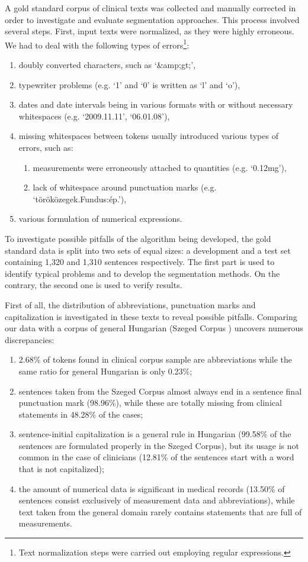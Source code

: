 A gold standard corpus of clinical texts was collected and manually corrected in order to investigate and evaluate segmentation approaches.
This process involved several steps. 
First, input texts were normalized, as they were highly erroneous.
We had to deal with the following types of errors\footnote{Text normalization steps were carried out employing regular expressions.}:
\begin{enumerate}
 \item doubly converted characters, such as `\&amp;gt;',
 \item typewriter problems (e.g. `1' and `0' is written as `l' and `o'),
 \item dates and date intervals being in various formats with or without necessary whitespaces (e.g. `2009.11.11', `06.01.08'),
 \item missing whitespaces between tokens usually introduced various types of errors, such as:
 \begin{enumerate}
  \item measurements were erroneously attached to quantities (e.g. `0.12mg'),
  \item lack of whitespace around punctuation marks (e.g. `töröközegek.Fundus:ép.'),
 \end{enumerate}
 \item various formulation of numerical expressions.
\end{enumerate}
 
To investigate possible pitfalls of the algorithm being developed, the gold standard data is split into two sets of equal sizes: a development and a test set containing 1,320 and 1,310 sentences respectively. 
The first part is used to identify typical problems and to develop the segmentation methods. 
On the contrary, the second one is used to verify results. 

First of all, the distribution of abbreviations, punctuation marks and capitalization is investigated in these texts to reveal possible pitfalls. 
Comparing our data with a corpus of general Hungarian (Szeged Corpus \cite{Csendes2004}) uncovers numerous discrepancies: 
\begin{enumerate}
 \item 2.68\% of tokens found in clinical corpus sample are abbreviations while the same ratio for general Hungarian is only 0.23\%; 
 \item sentences taken from the Szeged Corpus almost always end in a sentence final punctuation mark (98.96\%), while these are totally missing from clinical statements in 48.28\% of the cases; 
 \item sentence-initial capitalization is a general rule in Hungarian (99.58\% of the sentences are formulated properly in the Szeged Corpus), but its usage is not common in the case of clinicians (12.81\% of the sentences start with a word that is not capitalized); 
 \item the amount of numerical data is significant in medical records (13.50\% of sentences consist exclusively of measurement data and abbreviations), while text taken from the general domain rarely contains statements that are full of measurements. 
\end{enumerate}

